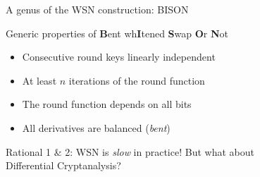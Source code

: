 \begin{frame}{A genus of the WSN construction: BISON}
    \centering
    \begin{block}{Generic properties of {\textbf{B}ent wh\textbf{I}tened \textbf{S}wap \textbf{O}r \textbf{N}ot}}
        \vspace{5pt}
        \begin{minipage}{0.51\textwidth}
        \begin{itemize}
            \item Consecutive round keys linearly independent
            \item At least $n$ iterations of the round function
        \end{itemize}
        \end{minipage}
        \begin{minipage}{0.44\textwidth}
        \begin{itemize}
            \item The round function depends on all bits
            \item All derivatives are balanced (\emph{bent})
        \end{itemize}
        \end{minipage}
        \vspace{5pt}
    \end{block}
    \textcolor{alertred}{Rational 1 \& 2: WSN is \emph{slow} in practice!}
    \vfill
    \begingroup
        But what about\\[5pt]
        \Large
        Differential Cryptanalysis?
    \endgroup
    \vfill
\end{frame}

